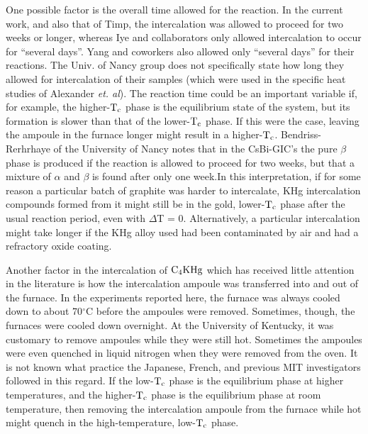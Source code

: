         One possible factor  is the overall time  allowed for the reaction.
In the  current   work,  and   also that of     Timp,\cite{timp83,J140} the
intercalation was  allowed to proceed for two  weeks or longer, whereas Iye
and collaborators\cite{iye82}  only  allowed  intercalation  to occur   for
``several days''.   Yang and coworkers also allowed  only  ``several days''
for their reactions.\cite{yang88}  The   Univ.  of  Nancy group  does   not
specifically state how long they allowed for intercalation of their samples
(which  were  used in   the specific heat  studies  of Alexander  {\em  et.
al\/}\cite{alexander81}). The reaction  time could be an important variable
if, for example, the higher-$\rm T_c$ phase is the equilibrium state of the
system, but its formation is slower than that of the lower-$\rm T_c$ phase.
If this were  the  case,  leaving the ampoule  in the furnace  longer might
result  in a  higher-$\rm T_c$.   Bendriss-Rerhrhaye of the   University of
Nancy notes  that in the CsBi-GIC's  the pure $\beta$  phase is produced if
the reaction is allowed to  proceed for  two weeks,  but that a  mixture of
$\alpha$ and $\beta$ is found  after only one week.\cite{bendriss86}In this
interpretation,  if for  some reason   a particular  batch of graphite  was
harder to  intercalate, KHg  intercalation compounds  formed  from it might
still be  in   the gold,  lower-$\rm T_c$  phase   after the usual reaction
period, even with $\Delta$T = 0.  Alternatively, a particular intercalation
might take longer if the KHg alloy used had  been  contaminated  by air and
had a refractory oxide coating.

        Another factor   in the intercalation  of $\rm  C_4KHg$   which has
received  little attention  in the literature    is  how the  intercalation
ampoule was transferred into and  out  of the furnace.  In the  experiments
reported here, the furnace  was always cooled  down  to about 70$^{\circ}$C
before  the ampoules were  removed.   Sometimes, though,  the furnaces were
cooled down overnight.  At the University  of Kentucky, it was customary to
remove ampoules  while they  were  still  hot.\cite{doll86} Sometimes   the
ampoules were even quenched in liquid nitrogen when  they were removed from
the  oven.\cite{delong82a,heinz83} It  is  not   known what  practice   the
Japanese,\cite{iye82}       French,\cite{elmakrini80a}   and       previous
MIT\cite{timp83} investigators followed  in this regard.    If the low-$\rm
T_c$ phase is  the equilibrium phase  at   higher  temperatures,  and the
higher-$\rm T_c$ phase is the equilibrium phase  at room temperature, then
removing the intercalation ampoule from the furnace while  hot might quench
in the high-temperature, low-$\rm T_c$ phase.

